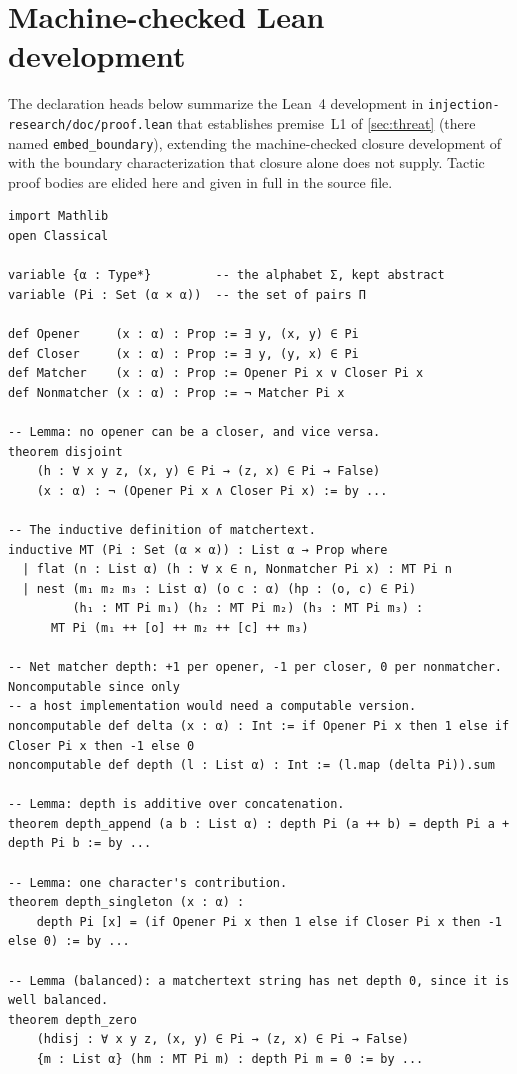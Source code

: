 \section{Machine-checked Lean development}
\label{sec:appendix:lean}

The declaration heads below summarize the Lean~4 development in
\texttt{injection-research/doc/proof.lean} that establishes premise~L1 of \cref{sec:threat} (there
named \texttt{embed\_boundary}), extending the machine-checked closure
development of~\cite{matchertext} with the boundary characterization that closure
alone does not supply.
Tactic proof bodies are elided here and given in full in the source file.

\begin{lstlisting}
import Mathlib
open Classical

variable {α : Type*}         -- the alphabet Σ, kept abstract
variable (Pi : Set (α × α))  -- the set of pairs Π

def Opener     (x : α) : Prop := ∃ y, (x, y) ∈ Pi
def Closer     (x : α) : Prop := ∃ y, (y, x) ∈ Pi
def Matcher    (x : α) : Prop := Opener Pi x ∨ Closer Pi x
def Nonmatcher (x : α) : Prop := ¬ Matcher Pi x

-- Lemma: no opener can be a closer, and vice versa.
theorem disjoint
    (h : ∀ x y z, (x, y) ∈ Pi → (z, x) ∈ Pi → False)
    (x : α) : ¬ (Opener Pi x ∧ Closer Pi x) := by ...

-- The inductive definition of matchertext.
inductive MT (Pi : Set (α × α)) : List α → Prop where
  | flat (n : List α) (h : ∀ x ∈ n, Nonmatcher Pi x) : MT Pi n
  | nest (m₁ m₂ m₃ : List α) (o c : α) (hp : (o, c) ∈ Pi)
         (h₁ : MT Pi m₁) (h₂ : MT Pi m₂) (h₃ : MT Pi m₃) :
      MT Pi (m₁ ++ [o] ++ m₂ ++ [c] ++ m₃)

-- Net matcher depth: +1 per opener, -1 per closer, 0 per nonmatcher. Noncomputable since only
-- a host implementation would need a computable version.
noncomputable def delta (x : α) : Int := if Opener Pi x then 1 else if Closer Pi x then -1 else 0
noncomputable def depth (l : List α) : Int := (l.map (delta Pi)).sum

-- Lemma: depth is additive over concatenation.
theorem depth_append (a b : List α) : depth Pi (a ++ b) = depth Pi a + depth Pi b := by ...

-- Lemma: one character's contribution.
theorem depth_singleton (x : α) :
    depth Pi [x] = (if Opener Pi x then 1 else if Closer Pi x then -1 else 0) := by ...

-- Lemma (balanced): a matchertext string has net depth 0, since it is well balanced.
theorem depth_zero
    (hdisj : ∀ x y z, (x, y) ∈ Pi → (z, x) ∈ Pi → False)
    {m : List α} (hm : MT Pi m) : depth Pi m = 0 := by ...


\end{lstlisting}
